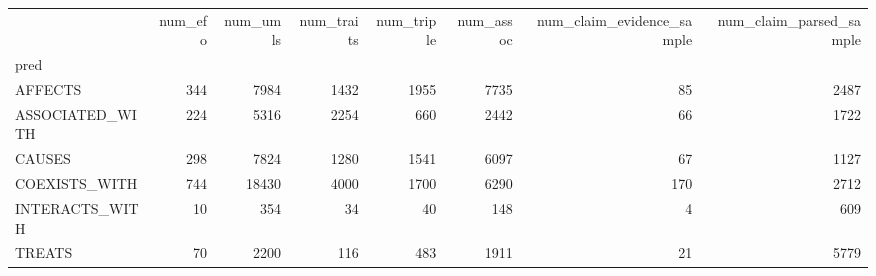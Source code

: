 \begin{tabular}{lrrrrrrr}
 & num_efo & num_umls & num_traits & num_triple & num_assoc & num_claim_evidence_sample & num_claim_parsed_sample \\
pred &  &  &  &  &  &  &  \\
AFFECTS & 344 & 7984 & 1432 & 1955 & 7735 & 85 & 2487 \\
ASSOCIATED_WITH & 224 & 5316 & 2254 & 660 & 2442 & 66 & 1722 \\
CAUSES & 298 & 7824 & 1280 & 1541 & 6097 & 67 & 1127 \\
COEXISTS_WITH & 744 & 18430 & 4000 & 1700 & 6290 & 170 & 2712 \\
INTERACTS_WITH & 10 & 354 & 34 & 40 & 148 & 4 & 609 \\
TREATS & 70 & 2200 & 116 & 483 & 1911 & 21 & 5779 \\
\end{tabular}

